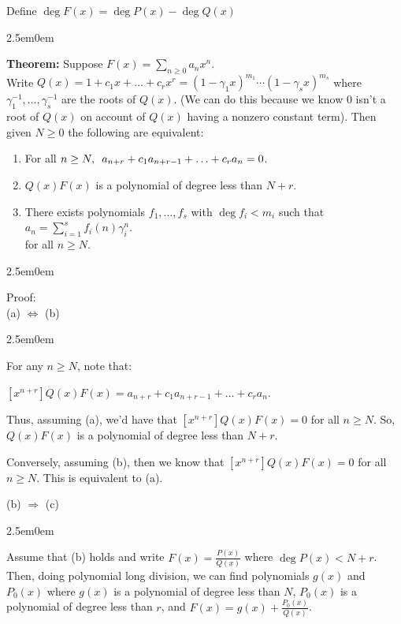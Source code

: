 \documentclass{book}
\newcommand{\hTwo}{%
\color{MidnightBlue}%
   \fontsize{13}{15}\selectfont%
}
\newcommand{\hThree}{%
   \color{PineGreen!85!Orange}
   \fontsize{12}{14}\selectfont%
}
\newenvironment{myIndent}{%
   \begin{adjustwidth}{2.5em}{0em}%
}{%
   \end{adjustwidth}%
}
\newcommand{\blab}[1]{\textbf{#1}}
\newcommand{\myHS}{ \hspace{0.5em}}
\newcommand{\retTwo}{\hfill\bigbreak}
\begin{document}
Define $\deg F(x) = \deg P(x) - \deg Q(x)$\retTwo

\begin{myIndent}\hTwo
   \blab{Theorem:} Suppose $F(x) = \sum\limits_{n \geq 0 }a_n x^n$.\\ Write $Q(x) = 1 + c_1x + \ldots + c_rx^r = (1 - \gamma_1x)^{m_1}\cdots(1 - \gamma_sx)^{m_s}$ where $\gamma_1^{-1}, \ldots, \gamma_s^{-1}$ are the roots of $Q(x)$. (We can do this because we know $0$ isn't a root of $Q(x)$ on account of $Q(x)$ having a nonzero constant term). Then given $N \geq 0$ the following are equivalent:
   \begin{enumerate}
      \item[(a)] For all $n \geq N,\myHS a_{n+r} + c_1a_{n+r-1} + \ldots + c_ra_n = 0$.\newpage
      \item[(b)] $Q(x)F(x)$ is a polynomial of degree less than $N + r$.\\ [-18pt]
      \item[(c)] There exists polynomials $f_1, \ldots, f_s$ with $\deg f_i < m_i$ such that $a_n = \sum\limits_{i=1}^s f_i(n)\gamma_i^n$.\\ [-6pt] for all $n \geq N$.\retTwo
   \end{enumerate}

   \begin{myIndent}\hThree
      Proof:\\
      (a) $\Longleftrightarrow$ (b)
      \begin{myIndent}
         For any $n \geq N$, note that:
         
         {\centering $[x^{n+r}]Q(x)F(x) = a_{n+r}+c_1a_{n+r-1} + \ldots + c_ra_n$.\retTwo\par}

         Thus, assuming (a), we'd have that $[x^{n+r}]Q(x)F(x) = 0$ for all $n \geq N$. So, $Q(x)F(x)$ is a polynomial of degree less than $N + r$.\retTwo

         Conversely, assuming (b), then we know that $[x^{n+r}]Q(x)F(x) = 0$ for all $n \geq N$. This is equivalent to (a).\retTwo      
      \end{myIndent}

      (b) $\Longrightarrow$ (c)
      \begin{myIndent}
         Assume that (b) holds and write $F(x) = \frac{P(x)}{Q(x)}$ where $\deg P(x) < N + r$. Then, doing polynomial long division, we can find polynomials $g(x)$ and $P_0(x)$ where $g(x)$ is a polynomial of degree less than $N$, $P_0(x)$ is a polynomial of degree less than $r$, and $F(x) = g(x) + \frac{P_0(x)}{Q(x)}$.\retTwo


\end{myIndent}
\end{myIndent}
\end{myIndent}
\end{document}
